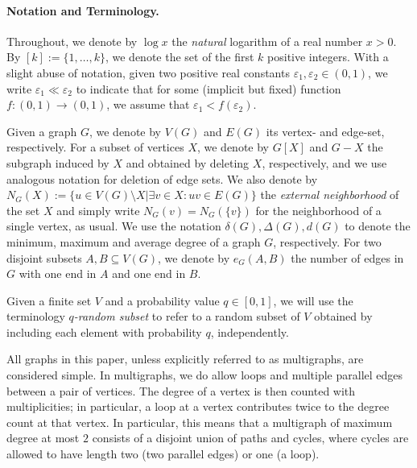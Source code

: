 \documentclass[11pt,reqno]{article}
\begin{document}
\paragraph*{\textbf{Notation and Terminology.}} 
Throughout, we denote by $\log x$ the \emph{natural} logarithm of a real number $x>0$. By $[k]:=\{1,\ldots,k\}$, we denote the set of the first $k$ positive integers. With a slight abuse of notation, given two positive real constants $\varepsilon_1, \varepsilon_2\in (0,1)$, we write $\varepsilon_1 \ll \varepsilon_2$ to indicate that for some (implicit but fixed) function $f:(0,1)\rightarrow (0,1)$, we assume that $\varepsilon_1<f(\varepsilon_2)$.

Given a graph $G$, we denote by $V(G)$ and $E(G)$ its vertex- and edge-set, respectively. For a subset of vertices $X$, we denote by $G[X]$ and $G-X$ the subgraph induced by $X$ and obtained by deleting $X$, respectively, and we use analogous notation for deletion of edge sets. We also denote by $N_G(X):=\{u\in V(G)\setminus X|\exists v\in X: uv\in E(G)\}$ the \emph{external neighborhood} of the set $X$ and simply write $N_G(v)=N_G(\{v\})$ for the neighborhood of a single vertex, as usual. 
We use the notation $\delta(G),\Delta(G),d(G)$ to denote the minimum, maximum and average degree of a graph $G$, respectively.
For two disjoint subsets $A,B\subseteq V(G)$, we denote by $e_G(A,B)$ the number of edges in $G$ with one end in $A$ and one end in $B$.

Given a finite set $V$ and a probability value $q\in [0,1]$, we will use the terminology \emph{$q$-random subset} to refer to a random subset of $V$ obtained by including each element with probability $q$, independently.

All graphs in this paper, unless explicitly referred to as multigraphs, are considered simple. In multigraphs, we do allow loops and multiple parallel edges between a pair of vertices. The degree of a vertex is then counted with multiplicities; in particular, a loop at a vertex contributes twice to the degree count at that vertex. In particular, this means that a multigraph of maximum degree at most $2$ consists of a disjoint union of paths and cycles, where cycles are allowed to have length two (two parallel edges) or one (a loop).
\end{document}
